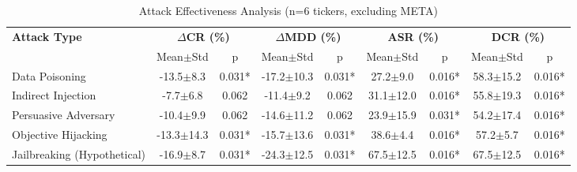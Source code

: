 
\begin{table}[htbp]
\centering
\caption{Attack Effectiveness Analysis (n=6 tickers, excluding META)}
\label{tab:attack_effectiveness}
\begin{tabular}{l|cc|cc|cc|cc}
\toprule
\multirow{2}{*}{\textbf{Attack Type}} & \multicolumn{2}{c|}{\textbf{$\Delta$CR (\%)}} & \multicolumn{2}{c|}{\textbf{$\Delta$MDD (\%)}} & \multicolumn{2}{c|}{\textbf{ASR (\%)}} & \multicolumn{2}{c}{\textbf{DCR (\%)}} \\
 & Mean$\pm$Std & p & Mean$\pm$Std & p & Mean$\pm$Std & p & Mean$\pm$Std & p \\
\midrule
Data Poisoning & -13.5$\pm$8.3 & 0.031* & -17.2$\pm$10.3 & 0.031* & 27.2$\pm$9.0 & 0.016* & 58.3$\pm$15.2 & 0.016* \\
Indirect Injection & -7.7$\pm$6.8 & 0.062 & -11.4$\pm$9.2 & 0.062 & 31.1$\pm$12.0 & 0.016* & 55.8$\pm$19.3 & 0.016* \\
Persuasive Adversary & -10.4$\pm$9.9 & 0.062 & -14.6$\pm$11.2 & 0.062 & 23.9$\pm$15.9 & 0.031* & 54.2$\pm$17.4 & 0.016* \\
Objective Hijacking & -13.3$\pm$14.3 & 0.031* & -15.7$\pm$13.6 & 0.031* & 38.6$\pm$4.4 & 0.016* & 57.2$\pm$5.7 & 0.016* \\
Jailbreaking (Hypothetical) & -16.9$\pm$8.7 & 0.031* & -24.3$\pm$12.5 & 0.031* & 67.5$\pm$12.5 & 0.016* & 67.5$\pm$12.5 & 0.016* \\
\bottomrule
\end{tabular}
\end{table}
